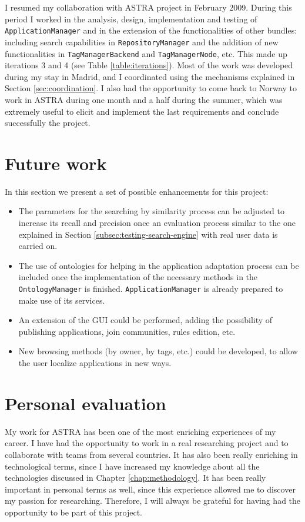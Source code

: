 I resumed my collaboration with ASTRA project in February 2009. During this
period I worked in the analysis, design, implementation and testing of\\
\verb|ApplicationManager| and in the extension of the functionalities of
other bundles: including search capabilities in \verb|RepositoryManager| and
the addition of new functionalities in \verb|TagManagerBackend| and
\verb|TagManagerNode|, etc. This made up iterations 3 and 4 (see Table
\ref{table:iterations}). Most of the work was developed during my stay in
Madrid, and I coordinated using the mechanisms explained in Section
\ref{sec:coordination}. I also had the opportunity to come back to Norway to
work in ASTRA during one month and a half during the summer, which was
extremely useful to elicit and implement the last requirements and conclude 
successfully the project.


\section{Future work}
\label{sec:future-work}
In this section we present a set of possible enhancements for this project:

\begin{itemize}
  \item The parameters for the searching by similarity process can be adjusted
  to increase its recall and precision once an evaluation process similar to
  the one explained in Section \ref{subsec:testing-search-engine} with real
  user data is carried on.
  \item The use of ontologies for helping in the application adaptation process
  can be included once the implementation of the necessary methods in the\\
  \verb|OntologyManager| is finished. \verb|ApplicationManager| is already
  prepared to make use of its services.
  \item An extension of the GUI could be performed, adding the possibility of
  publishing applications, join communities, rules edition, etc.
  \item New browsing methods (by owner, by tags, etc.) could be developed, to
  allow the user localize applications in new ways.
\end{itemize} 


\section{Personal evaluation}
My work for ASTRA has been one of the most enriching experiences of my
career. I have had the opportunity to work in a real researching project and
to collaborate with teams from several countries. It has also been really
enriching in technological terms, since I have increased my knowledge about all
the technologies discussed in Chapter \ref{chap:methodology}.
It has been really important in personal terms as well, since this experience
allowed me to discover my passion for researching.
Therefore, I will always be grateful for having had the opportunity to 
be part of this project.
